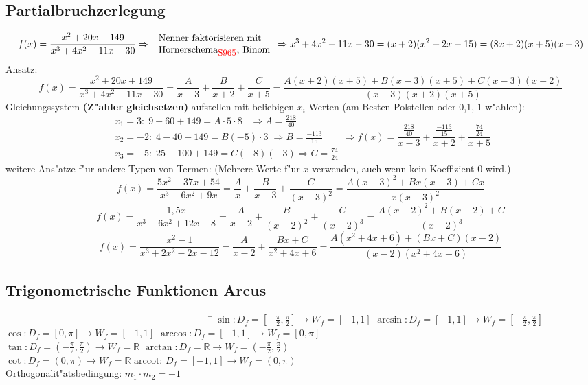 \begin{flushleft}
		\subsection{Partialbruchzerlegung}
			\[f(x)=\frac{x^2+20x+149}{x^3+4x^2-11x-30} \Rightarrow \; \begin{array}{l}\text{Nenner faktorisieren mit}\\
			\text{Hornerschema$_{\textcolor{red}{\mbox{\small{S965}}}}$, Binom}\end{array} \Rightarrow x^{3}+4x^{2}-11x-30=(x+2)(x^{2}+2x-15)=(8x+2)(x+5)(x-3)\]
			Ansatz:
			\[f(x)=\frac{x^2+20x+149}{x^3+4x^2-11x-30}=\frac{A}{x-3} + \frac{B}{x+2} + \frac{C}{x+5}=
			\frac{A(x+2)(x+5)+B(x-3)(x+5)+C(x-3)(x+2)}{(x-3)(x+2)(x+5)}\]
			Gleichungssystem \textbf{(Z"ahler gleichsetzen)} aufstellen mit beliebigen $x_i$-Werten (am Besten Polstellen oder 0,1,-1 w"ahlen):
			\[\begin{array}{l}x_1=3:\;9+60+149=A\cdot5\cdot8\;\;\;\Rightarrow A=\frac{218}{40}\\
			x_2=-2:\;4-40+149=B(-5)\cdot3\; \Rightarrow B=\frac{-113}{15}\\
			x_3=-5:\;25-100+149=C(-8)(-3) \Rightarrow C=\frac{74}{24} \end{array} \Rightarrow f(x)=\frac{\frac{218}{40}}{x-3}+\frac{\frac{-113}{15}}{x+2}+\frac{\frac{74}{24}}{x+5}\]
			weitere Ans"atze f"ur andere Typen von Termen: (Mehrere Werte f"ur $x$ verwenden, auch wenn kein Koeffizient 0 wird.)
			\[f(x)=\frac{5x^2-37x+54}{x^3-6x^2+9x}=\frac{A}{x}+\frac{B}{x-3}+\frac{C}{(x-3)^2}=\frac{A(x-3)^2+Bx(x-3)+Cx}{x(x-3)^2}\]
			\[f(x)=\frac{1,5x}{x^3-6x^2+12x-8}=\frac{A}{x-2}+\frac{B}{(x-2)^2}+\frac{C}{(x-2)^3}=\frac{A(x-2)^2+B(x-2)+C}{(x-2)^3}\]
			\[f(x)=\frac{x^2-1}{x^3+2x^2-2x-12}=\frac{A}{x-2}+\frac{Bx+C}{x^2+4x+6}=\frac{A(x^2+4x+6)+(Bx+C)(x-2)}{(x-2)(x^2+4x+6)}\]
							
		\subsection{Trigonometrische Funktionen Arcus}
			\begin{tabbing}
				-----------------------------------------------------------------\= \kill
				$\sin: D_f=[-\frac{\pi}{2},\frac{\pi}{2}]\rightarrow W_f=[-1,1]$ \> $\arcsin: D_f=[-1,1]\rightarrow W_f=[-\frac{\pi}{2},\frac{\pi}{2}]$\\
				$\cos: D_f=[0,\pi]\rightarrow W_f=[-1,1]$ \> $\arccos: D_f=[-1,1]\rightarrow W_f=[0,\pi]$\\
				$\tan: D_f=(-\frac{\pi}{2},\frac{\pi}{2})\rightarrow W_f=\mathbb{R}$ \> $\arctan: D_f=\mathbb{R}\rightarrow W_f=(-\frac{\pi}{2},\frac{\pi}{2})$\\
				$\cot: D_f=(0,\pi)\rightarrow W_f=\mathbb{R}$ \> arccot: $D_f=[-1,1]\rightarrow W_f=(0,\pi)$\\											
				Orthogonalit"atsbedingung: $m_1 \cdot m_2 = -1$
			\end{tabbing}



\end{flushleft}
